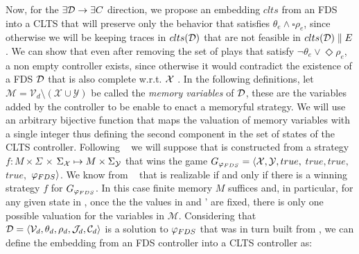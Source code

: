 Now,  for the $\exists \mathcal{D} \rightarrow \exists C$ direction, we propose an embedding $clts$ from an FDS into a CLTS that will preserve only the behavior that satisfies $\theta_e \wedge \square \rho_e$, since otherwise we will be keeping traces in $clts(\mathcal{D})$ that are not feasible in $clts(\mathcal{D})\parallel E$. We can show that even after removing the set of plays that satisfy $\neg \theta_e \vee \Diamond \rho_e$, a non empty controller exists, since otherwise it would contradict the existence of a FDS $\mathcal{D}$ that is also complete w.r.t. ${\mathcal{X}}$ . In the following definitions, let $\mathcal{M}= \mathcal{V}_d\setminus (\mathcal{X} \cup \mathcal{Y})$ be called the \emph{memory variables} of $\mathcal{D}$, these are the variables added by the controller to be enable to enact a memoryful strategy. We will use an arbitrary bijective function \enumSetDef that maps the valuation of memory variables with a single integer thus defining the second component in the set of states of the CLTS controller. 
Following ~\cite{bloem2012synthesis} we will suppose that \fdsD is constructed from a strategy $f: M \times \Sigma$ $\times$ $\Sigma_{{\mathcal{X}}} \mapsto M \times \Sigma_{{\mathcal{Y}}}$
that wins the game $G_{\varphi_{FDS}}=\langle {\ensuremath{\mathcal{X}}}, {\mathcal{Y}}, true,$ $true, true,$ $true,$ $\varphi_{FDS} \rangle$. We know from ~\cite{bloem2012synthesis} that \varphiLTL is realizable if and only if there is a winning strategy $f$ for $G_{\varphi_{FDS}}$. In this case finite memory $M$ suffices and, in particular, for any given state in \fdsD, once the the values in \gsV and \gsX' are fixed, there is only one possible valuation for the variables in $\mathcal{M}$. 
Considering that $\mathcal{D}= \langle \mathcal{V}_d, \theta_d, \rho_d, \mathcal{J}_d, \mathcal{C}_d\rangle$ is a solution to $\varphi_{FDS}$ that was in turn built from \controlProblemDef, we can define the embedding from an FDS controller \fdsD into a CLTS controller \ctrlEmbeddingDef{\fdsD}  as:


